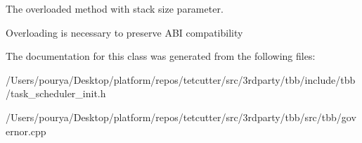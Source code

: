 The overloaded method with stack size parameter. 

Overloading is necessary to preserve A\+B\+I compatibility 

The documentation for this class was generated from the following files\+:\begin{DoxyCompactItemize}
\item 
/\+Users/pourya/\+Desktop/platform/repos/tetcutter/src/3rdparty/tbb/include/tbb/task\+\_\+scheduler\+\_\+init.\+h\item 
/\+Users/pourya/\+Desktop/platform/repos/tetcutter/src/3rdparty/tbb/src/tbb/governor.\+cpp\end{DoxyCompactItemize}
